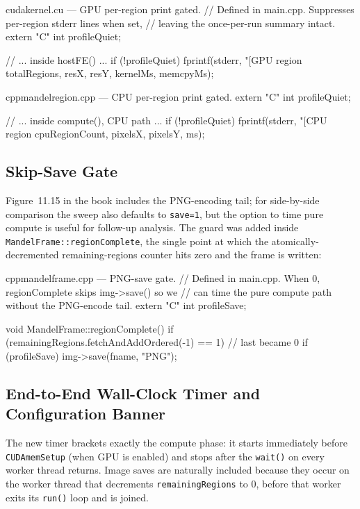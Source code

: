 \documentclass[
	english,
	letterpaper, oneside
]{article}
\begin{document}
\begin{sourcecode}{cuda}{kernel.cu --- GPU per-region print gated.}
// Defined in main.cpp.  Suppresses per-region stderr lines when set,
// leaving the once-per-run summary intact.
extern "C" int profileQuiet;

// ... inside hostFE() ...
if (!profileQuiet)
  fprintf(stderr,
          "[GPU region %
          totalRegions, resX, resY, kernelMs, memcpyMs);
\end{sourcecode}

\begin{sourcecode}{cpp}{mandelregion.cpp --- CPU per-region print gated.}
extern "C" int profileQuiet;

// ... inside compute(), CPU path ...
if (!profileQuiet)
  fprintf(stderr,
          "[CPU region %
          cpuRegionCount, pixelsX, pixelsY, ms);
\end{sourcecode}

\subsection{Skip-Save Gate}

Figure~11.15 in the book includes the PNG-encoding tail; for
side-by-side comparison the sweep also defaults to \texttt{save=1}, but
the option to time pure compute is useful for follow-up analysis. The
guard was added inside \texttt{MandelFrame::regionComplete}, the single
point at which the atomically-decremented remaining-regions counter
hits zero and the frame is written:

\begin{sourcecode}{cpp}{mandelframe.cpp --- PNG-save gate.}
// Defined in main.cpp.  When 0, regionComplete skips img->save() so we
// can time the pure compute path without the PNG-encode tail.
extern "C" int profileSave;

void MandelFrame::regionComplete()
{
  if (remainingRegions.fetchAndAddOrdered(-1) == 1)  // last became 0
  {
     if (profileSave)
       img->save(fname, "PNG");
  }
}
\end{sourcecode}

\subsection{End-to-End Wall-Clock Timer and Configuration Banner}

The new timer brackets exactly the compute phase: it starts immediately
before \texttt{CUDAmemSetup} (when GPU is enabled) and stops after the
\texttt{wait()} on every worker thread returns. Image saves are
naturally included because they occur on the worker thread that
decrements \texttt{remainingRegions} to 0, before that worker exits its
\texttt{run()} loop and is joined.
\end{document}
